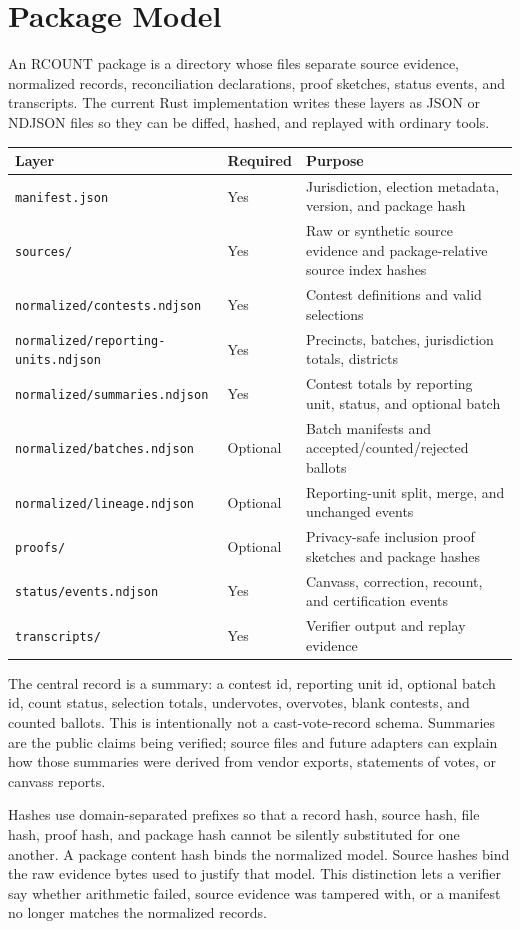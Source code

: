 \section{Package Model}

An RCOUNT package is a directory whose files separate source evidence,
normalized records, reconciliation declarations, proof sketches, status events,
and transcripts. The current Rust implementation writes these layers as JSON or
NDJSON files so they can be diffed, hashed, and replayed with ordinary tools.

\begin{center}
\small
\begin{tabularx}{\textwidth}{llX}
\toprule
Layer & Required & Purpose \\
\midrule
\texttt{manifest.json} & Yes & Jurisdiction, election metadata, version, and package hash \\
\texttt{sources/} & Yes & Raw or synthetic source evidence and package-relative source index hashes \\
\texttt{normalized/contests.ndjson} & Yes & Contest definitions and valid selections \\
\texttt{normalized/reporting-units.ndjson} & Yes & Precincts, batches, jurisdiction totals, districts \\
\texttt{normalized/summaries.ndjson} & Yes & Contest totals by reporting unit, status, and optional batch \\
\texttt{normalized/batches.ndjson} & Optional & Batch manifests and accepted/counted/rejected ballots \\
\texttt{normalized/lineage.ndjson} & Optional & Reporting-unit split, merge, and unchanged events \\
\texttt{proofs/} & Optional & Privacy-safe inclusion proof sketches and package hashes \\
\texttt{status/events.ndjson} & Yes & Canvass, correction, recount, and certification events \\
\texttt{transcripts/} & Yes & Verifier output and replay evidence \\
\bottomrule
\end{tabularx}
\end{center}

The central record is a summary: a contest id, reporting unit id, optional batch
id, count status, selection totals, undervotes, overvotes, blank contests, and
counted ballots. This is intentionally not a cast-vote-record schema. Summaries
are the public claims being verified; source files and future adapters can
explain how those summaries were derived from vendor exports, statements of
votes, or canvass reports.

Hashes use domain-separated prefixes so that a record hash, source hash, file
hash, proof hash, and package hash cannot be silently substituted for one
another. A package content hash binds the normalized model. Source hashes bind
the raw evidence bytes used to justify that model. This distinction lets a
verifier say whether arithmetic failed, source evidence was tampered with, or a
manifest no longer matches the normalized records.
